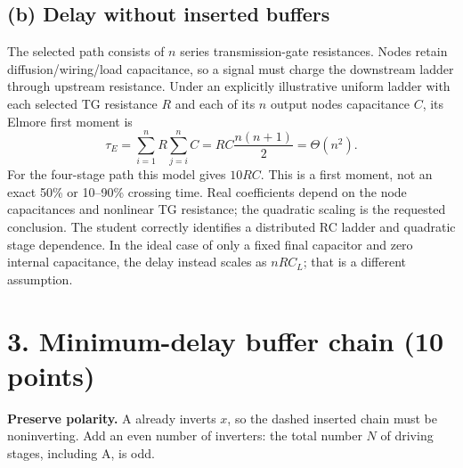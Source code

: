 \documentclass[10pt]{article}
\begin{document}
\begin{center}
\end{center}
\subsection*{(b) Delay without inserted buffers}
The selected path consists of $n$ series transmission-gate resistances. Nodes retain diffusion/wiring/load capacitance, so a signal must charge the downstream ladder through upstream resistance. Under an explicitly illustrative uniform ladder with each selected TG resistance $R$ and each of its $n$ output nodes capacitance $C$, its Elmore first moment is
\[
\tau_E=\sum_{i=1}^n R\sum_{j=i}^n C=RC\frac{n(n+1)}2=\Theta(n^2).
\]
For the four-stage path this model gives $10RC$. This is a first moment, not an exact 50\% or 10--90\% crossing time. Real coefficients depend on the node capacitances and nonlinear TG resistance; the quadratic scaling is the requested conclusion. The student correctly identifies a distributed RC ladder and quadratic stage dependence. In the ideal case of only a fixed final capacitor and zero internal capacitance, the delay instead scales as $nRC_L$; that is a different assumption.

\newpage\section*{3. Minimum-delay buffer chain (10 points)}
\textbf{Preserve polarity.} A already inverts $x$, so the dashed inserted chain must be noninverting. Add an even number of inverters: the total number $N$ of driving stages, including A, is odd.
\end{document}
